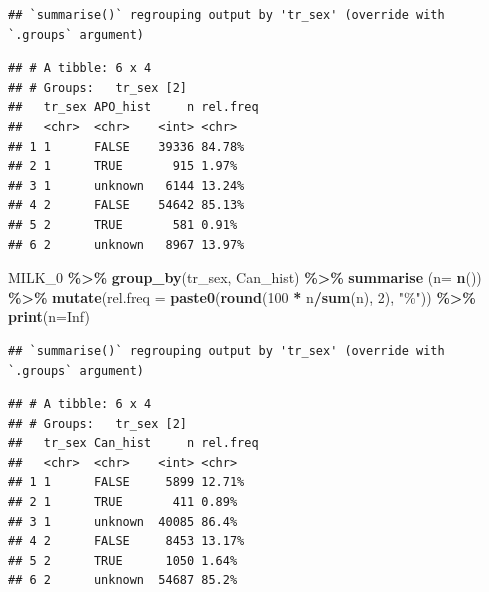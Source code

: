 \documentclass[
]{article}
\newenvironment{Shaded}{\begin{snugshade}}{\end{snugshade}}
\newcommand{\DataTypeTok}[1]{\textcolor[rgb]{0.13,0.29,0.53}{#1}}
\newcommand{\DecValTok}[1]{\textcolor[rgb]{0.00,0.00,0.81}{#1}}
\newcommand{\KeywordTok}[1]{\textcolor[rgb]{0.13,0.29,0.53}{\textbf{#1}}}
\newcommand{\NormalTok}[1]{#1}
\newcommand{\OperatorTok}[1]{\textcolor[rgb]{0.81,0.36,0.00}{\textbf{#1}}}
\newcommand{\OtherTok}[1]{\textcolor[rgb]{0.56,0.35,0.01}{#1}}
\newcommand{\StringTok}[1]{\textcolor[rgb]{0.31,0.60,0.02}{#1}}
\begin{document}
\begin{verbatim}
## `summarise()` regrouping output by 'tr_sex' (override with `.groups` argument)
\end{verbatim}

\begin{verbatim}
## # A tibble: 6 x 4
## # Groups:   tr_sex [2]
##   tr_sex APO_hist     n rel.freq
##   <chr>  <chr>    <int> <chr>   
## 1 1      FALSE    39336 84.78%  
## 2 1      TRUE       915 1.97%   
## 3 1      unknown   6144 13.24%  
## 4 2      FALSE    54642 85.13%  
## 5 2      TRUE       581 0.91%   
## 6 2      unknown   8967 13.97%
\end{verbatim}

\begin{Shaded}
\begin{Highlighting}[]
\NormalTok{MILK\_}\DecValTok{0} \OperatorTok{\%\textgreater{}\%}\StringTok{ }
\StringTok{  }\KeywordTok{group\_by}\NormalTok{(tr\_sex, Can\_hist) }\OperatorTok{\%\textgreater{}\%}\StringTok{ }
\StringTok{  }\KeywordTok{summarise}\NormalTok{ (}\DataTypeTok{n=} \KeywordTok{n}\NormalTok{()) }\OperatorTok{\%\textgreater{}\%}
\StringTok{  }\KeywordTok{mutate}\NormalTok{(}\DataTypeTok{rel.freq =} \KeywordTok{paste0}\NormalTok{(}\KeywordTok{round}\NormalTok{(}\DecValTok{100} \OperatorTok{*}\StringTok{ }\NormalTok{n}\OperatorTok{/}\KeywordTok{sum}\NormalTok{(n), }\DecValTok{2}\NormalTok{), }\StringTok{"\%"}\NormalTok{))  }\OperatorTok{\%\textgreater{}\%}\StringTok{ }
\StringTok{  }\KeywordTok{print}\NormalTok{(}\DataTypeTok{n=}\OtherTok{Inf}\NormalTok{)}
\end{Highlighting}
\end{Shaded}

\begin{verbatim}
## `summarise()` regrouping output by 'tr_sex' (override with `.groups` argument)
\end{verbatim}

\begin{verbatim}
## # A tibble: 6 x 4
## # Groups:   tr_sex [2]
##   tr_sex Can_hist     n rel.freq
##   <chr>  <chr>    <int> <chr>   
## 1 1      FALSE     5899 12.71%  
## 2 1      TRUE       411 0.89%   
## 3 1      unknown  40085 86.4%   
## 4 2      FALSE     8453 13.17%  
## 5 2      TRUE      1050 1.64%   
## 6 2      unknown  54687 85.2%
\end{verbatim}
\end{document}
